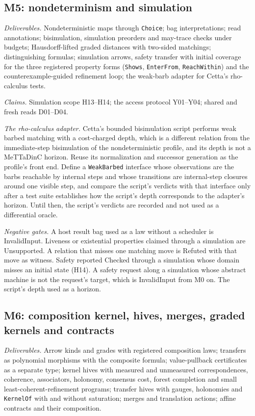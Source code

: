 \documentclass[11pt]{article}
\newcommand{\code}[1]{\texttt{#1}}
\begin{document}
\subsection{M5: nondeterminism and simulation}

\emph{Deliverables.} Nondeterministic maps through \code{Choice}; bag interpretations; read
annotations; bisimulation, simulation preorders and may-trace checks under budgets; Hausdorff-lifted
graded distances with two-sided matchings; distinguishing formulas; simulation arrows, safety transfer
with initial coverage for the three registered property forms (\code{Shows}, \code{EnterFrom},
\code{ReachWithin}) and the counterexample-guided refinement loop; the weak-barb adapter for Cetta's
rho-calculus tests.

\emph{Claims.} Simulation scope H13--H14; the access protocol Y01--Y04; shared and fresh reads D01--D04.

\emph{The rho-calculus adapter.} Cetta's bounded bisimulation script performs weak barbed matching
with a cost-charged depth, which is a different relation from the immediate-step bisimulation of the
nondeterministic profile, and its depth is not a MeTTaDinC horizon. Reuse its normalization and
successor generation as the profile's front end. Define a \code{WeakBarbed} interface whose
observations are the barbs reachable by internal steps and whose transitions are internal-step
closures around one visible step, and compare the script's verdicts with that interface only after a
test suite establishes how the script's depth corresponds to the adapter's horizon. Until then, the
script's verdicts are recorded and not used as a differential oracle.

\emph{Negative gates.} A host result bag used as a law without a scheduler is InvalidInput. Liveness or
existential properties claimed through a simulation are Unsupported. A relation that misses one matching
move is Refuted with that move as witness. Safety reported Checked through a simulation whose domain
misses an initial state (H14). A safety request along a simulation whose abstract machine is not the
request's target, which is InvalidInput from M0 on. The script's depth used as a horizon.

\subsection{M6: composition kernel, hives, merges, graded kernels and contracts}

\emph{Deliverables.} Arrow kinds and grades with registered composition laws; transfers as polynomial
morphisms with the composite formula; value-pullback certificates as a separate type; kernel hives
with measured and unmeasured correspondences, coherence, associators, holonomy, consensus cost, forest
completion and small least-coherent-refinement programs; transfer hives with gauges, holonomies and
\code{KernelOf} with and without saturation; merges and translation actions; affine contracts and
their composition.
\end{document}
